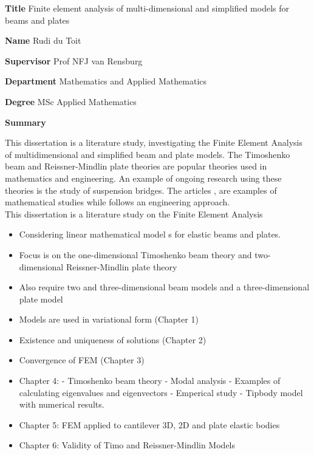 \documentclass[main.tex]{subfiles}
\begin{document}
\textbf{Title} Finite element analysis of multi-dimensional and simplified models for beams and plates

\textbf{Name} Rudi du Toit

\textbf{Supervisor} Prof NFJ van Rensburg

\textbf{Department} Mathematics and Applied Mathematics

\textbf{Degree} MSc Applied Mathematics

\begin{center}
	\large \textbf{Summary}
\end{center}
This dissertation is a literature study, investigating the Finite Element Analysis of multidimensional and simplified beam and plate models. The Timoshenko beam and Reissner-Mindlin plate theories are popular theories used in mathematics and engineering. An example of ongoing research using these theories is the study of suspension bridges. The articles \cite{Mck99}, \cite{BOC20} are examples of mathematical studies while \cite{SV86} follows an engineering approach.\\


 This dissertation is a literature study on the Finite Element Analysis 
 \begin{itemize}
	\item Considering linear mathematical model s for elastic beams and plates.
	\item Focus is on the one-dimensional Timoshenko beam theory and two-dimensional Reissner-Mindlin plate theory
	\item Also require two and three-dimensional beam models and a three-dimensional plate model
	\item Models are used in variational form (Chapter 1)
	\item Existence and uniqueness of solutions (Chapter 2)
	\item Convergence of FEM (Chapter 3)
	\item Chapter 4: - Timoshenko beam theory - Modal analysis - Examples of calculating eigenvalues and eigenvectors - Emperical study - Tipbody model with numerical results.
	\item Chapter 5: FEM applied to cantilever 3D, 2D and plate elastic bodies
	\item Chapter 6: Validity of Timo and Reissner-Mindlin Models
\end{itemize}
\end{document}
